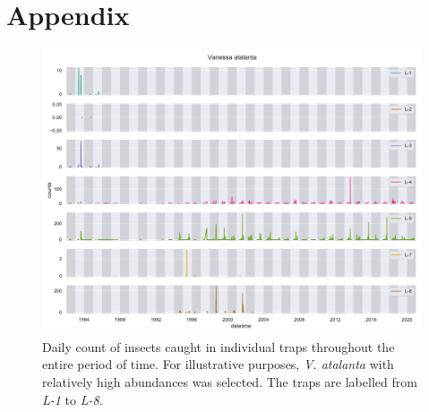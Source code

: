 \section{Appendix}\label{appendix}

\begin{figure}[H]
	\centering
	\includegraphics[width=0.9\linewidth]{figs/v-atalanta_single-traps}
	\caption{Daily count of insects caught in individual traps throughout the entire period of time. For illustrative purposes, \textit{V. atalanta} with relatively high abundances was selected. The traps are labelled from \textit{L-1} to \textit{L-8}.}
	\label{fig:v-atalanta}
\end{figure}


